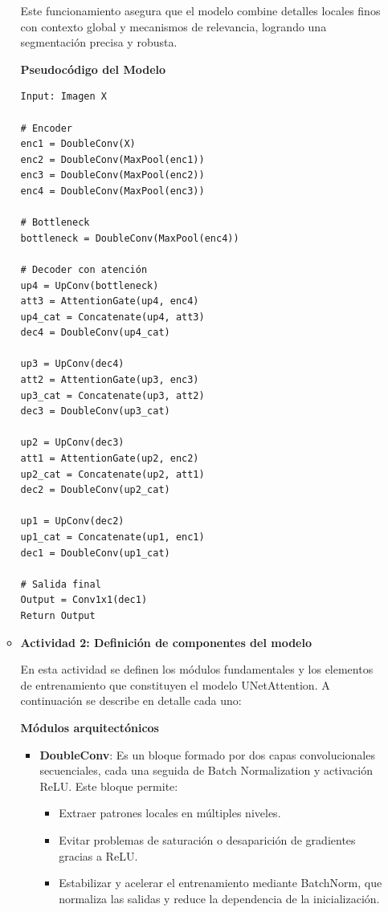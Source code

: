 \begin{enumerate}
\begin{itemize}
Este funcionamiento asegura que el modelo combine detalles locales finos con contexto global y mecanismos de relevancia, logrando una segmentación precisa y robusta.


\textbf{Pseudocódigo del Modelo}
\begin{verbatim}
Input: Imagen X

# Encoder
enc1 = DoubleConv(X)
enc2 = DoubleConv(MaxPool(enc1))
enc3 = DoubleConv(MaxPool(enc2))
enc4 = DoubleConv(MaxPool(enc3))

# Bottleneck
bottleneck = DoubleConv(MaxPool(enc4))

# Decoder con atención
up4 = UpConv(bottleneck)
att3 = AttentionGate(up4, enc4)
up4_cat = Concatenate(up4, att3)
dec4 = DoubleConv(up4_cat)

up3 = UpConv(dec4)
att2 = AttentionGate(up3, enc3)
up3_cat = Concatenate(up3, att2)
dec3 = DoubleConv(up3_cat)

up2 = UpConv(dec3)
att1 = AttentionGate(up2, enc2)
up2_cat = Concatenate(up2, att1)
dec2 = DoubleConv(up2_cat)

up1 = UpConv(dec2)
up1_cat = Concatenate(up1, enc1)
dec1 = DoubleConv(up1_cat)

# Salida final
Output = Conv1x1(dec1)
Return Output
\end{verbatim}

  \item\textbf{Actividad 2: Definición de componentes del modelo}

  En esta actividad se definen los módulos fundamentales y los elementos de entrenamiento que constituyen el modelo UNetAttention. A continuación se describe en detalle cada uno:

\textbf{Módulos arquitectónicos}

\begin{itemize}
\item \textbf{DoubleConv}:
Es un bloque formado por dos capas convolucionales secuenciales, cada una seguida de Batch Normalization y activación ReLU.
Este bloque permite:
\begin{itemize}
\item Extraer patrones locales en múltiples niveles.
\item Evitar problemas de saturación o desaparición de gradientes gracias a ReLU.
\item Estabilizar y acelerar el entrenamiento mediante BatchNorm, que normaliza las salidas y reduce la dependencia de la inicialización.
\end{itemize}


\end{itemize}
\end{itemize}
\end{enumerate}
